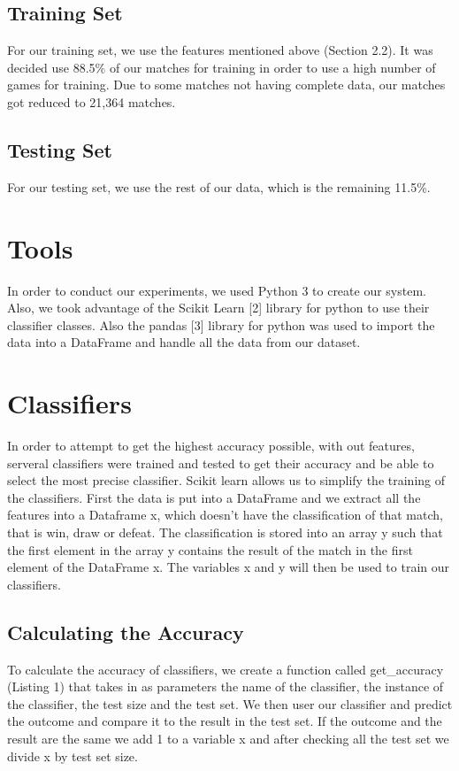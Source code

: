 \documentclass[10pt,journal,compsoc]{IEEEtran}
\begin{document}
\subsection{Training Set}
For our training set, we use the features mentioned above (Section 2.2). It was decided use 88.5\% of our matches for training in order to use a high number of games for training. Due to some matches not having complete data, our matches got reduced to 21,364 matches.


\subsection{Testing Set}
For our testing set, we use the rest of our data, which is the remaining 11.5\%.


\section{Tools}
In order to conduct our experiments, we used Python 3 to create our system. Also, we took advantage of the Scikit Learn [2] library for python to use their classifier classes. Also the pandas [3] library for python was used to import the data into a DataFrame and handle all the data from our dataset.


\section{Classifiers}
In order to attempt to get the highest accuracy possible, with out features, serveral classifiers were trained and tested to get their accuracy and be able to select the most precise classifier. Scikit learn allows us to simplify the training of the classifiers. First the data is put into a DataFrame and we extract all the features into a Dataframe x, which doesn’t have the classification of that match, that is win, draw or defeat. The classification is stored into an array y such that the first element in the array y contains the result of the match in the first element of the DataFrame x. The variables x and y will then be used to train our classifiers.


\subsection{Calculating the Accuracy}
To calculate the accuracy of classifiers, we create a function called get\_accuracy (Listing 1) that takes in as parameters the name of the classifier, the instance of the classifier, the test size and the test set. We then user our classifier and predict the outcome and compare it to the result in the test set. If the outcome and the result are the same we add 1 to a variable x and after checking all the test set we divide x by test set size.
\end{document}
